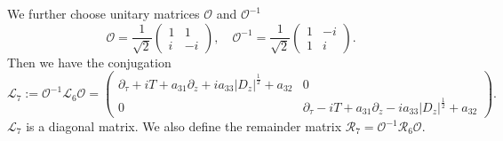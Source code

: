 \documentclass[12pt]{amsart}
\theoremstyle{remark}
\theoremstyle{definition}
\numberwithin{equation}{section}
\newcommand{\p}{\partial}
\newcommand{\f}{\frac}
\newcommand{\mL}{\mathcal{L}}
\newcommand{\mR}{\mathcal{R}}
\begin{document}
We further choose unitary matrices $\mathcal{O}$ and $\mathcal{O}^{-1}$
\begin{equation} \label{ODef}
\mathcal{O} = \frac{1}{\sqrt{2}} \begin{pmatrix}
 1    & 1 \\ 
i &  -i
\end{pmatrix}, \quad \mathcal{O}^{-1} = \frac{1}{\sqrt{2}} \begin{pmatrix}
 1    & -i \\ 
1 &  i
\end{pmatrix}.
\end{equation}
Then we have the conjugation
\begin{equation*}
\mathcal{L}_7 :=\mathcal{O}^{-1}\mL_6 \mathcal{O}
=\begin{pmatrix}
 \p_\tau +iT+a_{31}\p_z +ia_{33}|D_z|^\f12+ a_{32}    & 0 \\ 
0 &  \p_\tau -iT+a_{31}\p_z -ia_{33}|D_z|^\f12+ a_{32}
\end{pmatrix}.
\end{equation*}
$\mathcal{L}_7$ is a diagonal matrix.
We also define the remainder matrix $\mR_7 = \mathcal{O}^{-1}\mR_6 \mathcal{O}$.
\end{document}
